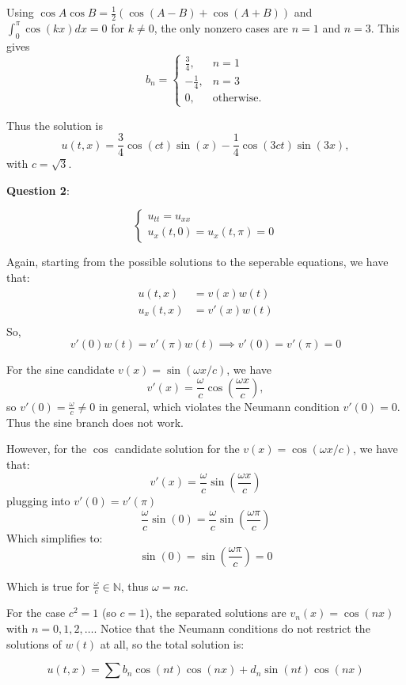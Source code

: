 \documentclass{article}
\newcommand{\question}[2][]{
  \begin{flushleft}
    \textbf{Question #1}: \textit{#2}

\end{flushleft}}
\begin{document}
Using $\cos A\cos B = \frac{1}{2}(\cos(A-B)+\cos(A+B))$ and
$\int_0^\pi \cos(kx)dx = 0$ for $k \ne 0$, the only nonzero cases are
$n=1$ and $n=3$. This gives
\[
  b_n =
  \begin{cases}
    \frac{3}{4}, & n=1 \\
    -\frac{1}{4}, & n=3 \\
    0, & \text{otherwise}.
  \end{cases}
\]

Thus the solution is
\[
  u(t,x) = \frac{3}{4}\cos(ct)\sin(x) - \frac{1}{4}\cos(3ct)\sin(3x),
\]
with $c=\sqrt{3}$.
\question[2]{}
$$
\begin{cases}
  u_{tt} = u_{xx} \\
  u_x(t, 0) = u_x(t, \pi ) = 0
\end{cases}
$$

Again, starting from the possible solutions to the seperable
equations, we have that:
\begin{align*}
  u(t,x) &= v(x)w(t)\\
  u_x(t,x) &= v'(x)w(t) \\
\end{align*}
So,
\[
  v'(0)w(t) = v'(\pi)w(t) \implies v'(0) = v'(\pi) = 0
\]

For the sine candidate $v(x)=\sin(\omega x/c)$, we have
\[
  v'(x)=\frac{\omega}{c}\cos\left(\frac{\omega x}{c}\right),
\]
so $v'(0)=\frac{\omega}{c}\neq 0$ in general, which violates the
Neumann condition $v'(0)=0$. Thus the sine branch does not work.

However, for the $\cos$ candidate solution for the $v(x) =
\cos(\omega x/c)$, we have that:
\[
  v'(x) = \frac{\omega}{c}\sin\left(\frac{\omega x}{c}\right)
\]
plugging into $v'(0) = v'(\pi)$
\[
  \frac{\omega}{c}\sin\left(0\right) =
  \frac{\omega}{c}\sin\left(\frac{\omega \pi}{c}\right)
\]
Which simplifies to:
\[
  \sin(0) = \sin(\frac{\omega\pi}{c}) = 0
\]

Which is true for $\frac{\omega}{c} \in \mathbb{N}$, thus $\omega = nc$.

For the case $c^2=1$ (so $c=1$), the separated solutions are
$v_n(x)=\cos(nx)$ with $n=0,1,2,\dots$. Notice that the Neumann
conditions do not restrict the solutions of $w(t)$ at all, so the
total solution is:

$$
u(t,x) = \sum b_n\cos(nt)\cos(nx) + d_n\sin(nt)\cos(nx)
$$
\end{document}
